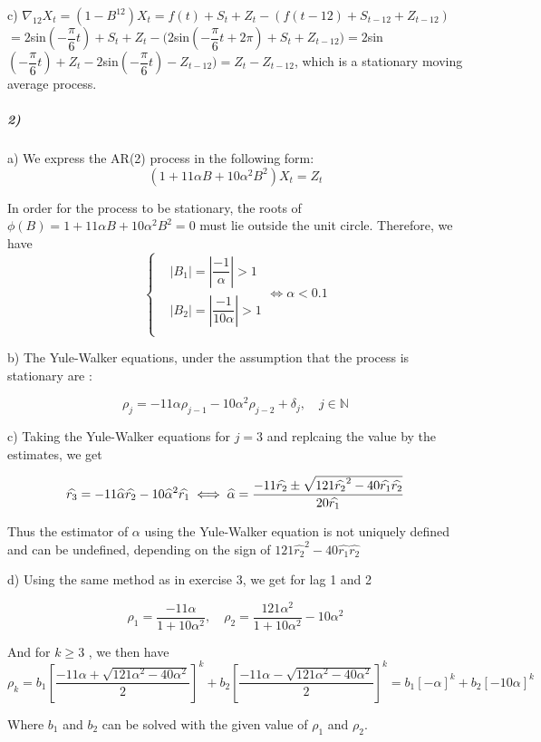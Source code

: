 \documentclass{article}
\begin{document}
c) $\nabla_{12}X_t=(1-B^{12})X_t=f(t)+S_t+Z_t- (f(t-12)+S_{t-12}+Z_{t-12})$\\$=2$sin$(-\dfrac{\pi}{6}t)+S_t+Z_t-(2$sin$(-\dfrac{\pi}{6}t+2\pi)+S_{t}+Z_{t-12})=2$sin$(-\dfrac{\pi}{6}t)+Z_t-2$sin$(-\dfrac{\pi}{6}t)-Z_{t-12})=Z_t-Z_{t-12}$, which is a stationary moving average process.
\\

\subparagraph{2)}
a) We express the AR(2) process in the following form:
\[
(1+11\alpha B+10\alpha^2 B^{2})X_{t}=Z_{t}
\]


In order for the process to be stationary, the roots of $\phi(B)=1+11\alpha B+10\alpha^2 B^{2}=0$
must lie outside the unit circle. Therefore, we have
\[
\left\{
\begin{array}{cc}
& |B_{1}|=\left| \dfrac{-1}{\alpha} \right|>1 \\
& |B_{2}|=\left| \dfrac{-1}{10\alpha} \right|>1\\
\end{array}
\right.
\iff \alpha<0.1
\]

b) The Yule-Walker equations, under the assumption that the process is stationary are :

\[
\rho_j=-11\alpha\rho_{j-1}-10\alpha^2\rho_{j-2} +\delta_j, \quad j\in \mathbb{N}
\]

c) Taking the Yule-Walker equations for $j=3$ and replcaing the value by the estimates, we get

\[
\widehat{r_3} =-11\widehat{\alpha} \widehat{r_2}-10\widehat{\alpha}^2 \widehat{r_1} \\
\iff \widehat{\alpha}=\dfrac{-11\widehat{r_2} \pm \sqrt{121\widehat{r_2}^2-40\widehat{r_1}\widehat{r_2}}}{20\widehat{r_1}}
\]

Thus the estimator of $\alpha$ using the Yule-Walker equation is not uniquely defined and can be undefined, depending on the sign of $121\widehat{r_2}^2-40\widehat{r_1}\widehat{r_2}$

d) Using the same method as in exercise 3, we get for lag 1 and 2

\[
\rho_{1}=\frac{-11\alpha}{1+10\alpha^2}, \quad 
\rho_{2}=\frac{121\alpha^{2}}{1+10\alpha^2}-10\alpha^2
\]

And for $k \geq 3$ , we then have 
\[
\rho_{k}=
b_{1}[\frac{-11\alpha+\sqrt{121\alpha^{2}-40\alpha^2}}{2}]^{k}+b_{2}[\frac{-11\alpha-\sqrt{121\alpha^{2}-40\alpha^2}}{2}]^{k}=b_{1}[-\alpha]^{k}+b_{2}[-10\alpha]^{k}
\]

Where $b_{1}$ and $b_{2}$ can be solved with the given value of $\rho_{1}$ and $\rho_{2}$.
\end{document}
